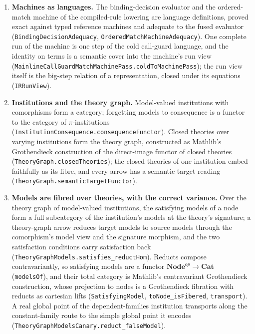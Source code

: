 \documentclass[11pt]{article}
\theoremstyle{definition}
\theoremstyle{remark}
\begin{document}
\begin{enumerate}
  bisimilarity; a term map with one escaping target step is the map of no
  pass (\nolinkurl{no_pass_of_escape}).
\item \textbf{Machines as languages.}  The binding-decision evaluator and the
  ordered-match machine of the compiled-rule lowering are language
  definitions, proved exact against typed reference machines and adequate
  to the fused evaluator (\nolinkurl{BindingDecisionAdequacy},
  \nolinkurl{OrderedMatchMachineAdequacy}).  One complete run of the machine is
  one step of the cold call-guard language, and the identity on terms is a
  semantic cover into the machine's run view
  (\nolinkurl{MainlineCallGuardMatchMachinePass.coldToMachinePass}); the run view
  itself is the big-step relation of a representation, closed under its
  equations (\texttt{IRRunView}).
\item \textbf{Institutions and the theory graph.}  Model-valued institutions
  with comorphisms form a category; forgetting models to consequence is a
  functor to the category of $\pi$-institutions
  (\nolinkurl{InstitutionConsequence.consequenceFunctor}).  Closed theories over
  varying institutions form the theory graph, constructed as Mathlib's
  Grothendieck construction of the direct-image functor of closed theories
  (\nolinkurl{TheoryGraph.closedTheories}); the closed theories of one
  institution embed faithfully as its fibre, and every arrow has a semantic
  target reading (\nolinkurl{TheoryGraph.semanticTargetFunctor}).
\item \textbf{Models are fibred over theories, with the correct variance.}
  Over the theory graph of model-valued institutions, the satisfying models
  of a node form a full subcategory of the institution's models at the
  theory's signature; a theory-graph arrow reduces target models to source
  models through the comorphism's model view and the signature morphism, and
  the two satisfaction conditions carry satisfaction back
  (\nolinkurl{TheoryGraphModels.satisfies_reductHom}).  Reducts compose
  contravariantly, so satisfying models are a functor
  $\mathbf{Node}^{op}\to\mathbf{Cat}$ (\texttt{modelsOf}), and their total
  category is Mathlib's contravariant Grothendieck construction, whose
  projection to nodes is a Grothendieck fibration with reducts as cartesian
  lifts (\texttt{SatisfyingModel}, \texttt{toNode\_isFibered},
  \texttt{transport}).  A real global point of the dependent-families
  institution transports along the constant-family route to the simple
  global point it encodes (\nolinkurl{TheoryGraphModelsCanary.reduct_falseModel}).

\end{enumerate}
\end{document}
